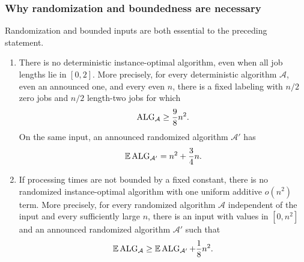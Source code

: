 \subsubsection{Why randomization and boundedness are necessary}

Randomization and bounded inputs are both essential to the preceding
statement.

\begin{theorem}
\label{thm:ot-instance-impossibility}
\begin{enumerate}[label=\textnormal{(\roman*)}]
\item There is no deterministic instance-optimal algorithm, even when all job
lengths lie in $[0,2]$.  More precisely, for every deterministic algorithm
$\mathcal A$, even an announced one, and every even $n$, there is a fixed
labeling with $n/2$ zero jobs and $n/2$ length-two jobs for which
\begin{equation}
 \operatorname{ALG}_{\mathcal A}\ge\frac98n^2.
 \label{eq:ot-det-not-instance-optimal}
\end{equation}
On the same input, an announced randomized algorithm $\mathcal A'$ has
\[
 \mathbb{E}\operatorname{ALG}_{\mathcal A'}=n^2+\frac34n.
\]

\item If processing times are not bounded by a fixed constant, there is no
randomized instance-optimal algorithm with one uniform additive $o(n^2)$
term.  More precisely, for every randomized algorithm $\mathcal A$
independent of the input and every sufficiently large $n$, there is an input
with values in $[0,n^2]$ and an announced randomized algorithm $\mathcal A'$
such that
\begin{equation}
 \mathbb{E}\operatorname{ALG}_{\mathcal A}\ge\mathbb{E}\operatorname{ALG}_{\mathcal A'}+\frac18n^2.
 \label{eq:ot-unbounded-not-instance-optimal}
\end{equation}
\end{enumerate}
\end{theorem}

